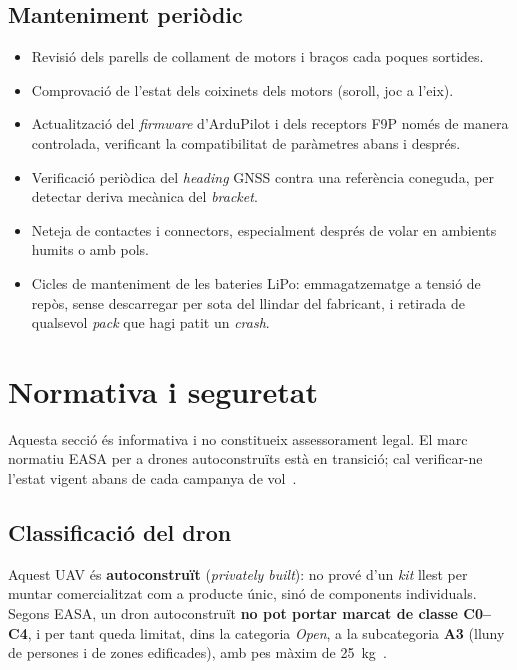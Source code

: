 \subsection{Manteniment periòdic}
\begin{itemize}
    \item Revisió dels parells de collament de motors i braços cada poques sortides.
    \item Comprovació de l'estat dels coixinets dels motors (soroll, joc a l'eix).
    \item Actualització del \emph{firmware} d'ArduPilot i dels receptors F9P només de manera controlada, verificant la compatibilitat de paràmetres abans i després.
    \item Verificació periòdica del \emph{heading} GNSS contra una referència coneguda, per detectar deriva mecànica del \emph{bracket}.
    \item Neteja de contactes i connectors, especialment després de volar en ambients humits o amb pols.
    \item Cicles de manteniment de les bateries LiPo: emmagatzematge a tensió de repòs, sense descarregar per sota del llindar del fabricant, i retirada de qualsevol \emph{pack} que hagi patit un \emph{crash}.
\end{itemize}

\section{Normativa i seguretat}
\label{sec:normativa}

Aquesta secció és informativa i no constitueix assessorament legal. El marc normatiu EASA per a drones autoconstruïts està en transició; cal verificar-ne l'estat vigent abans de cada campanya de vol~\cite{easa_open_category}.

\subsection{Classificació del dron}

Aquest UAV és \textbf{autoconstruït} (\emph{privately built}): no prové d'un \emph{kit} llest per muntar comercialitzat com a producte únic, sinó de components individuals. Segons EASA, un dron autoconstruït \textbf{no pot portar marcat de classe C0--C4}, i per tant queda limitat, dins la categoria \emph{Open}, a la subcategoria \textbf{A3} (lluny de persones i de zones edificades), amb pes màxim de 25~kg~\cite{easa_open_category}.


